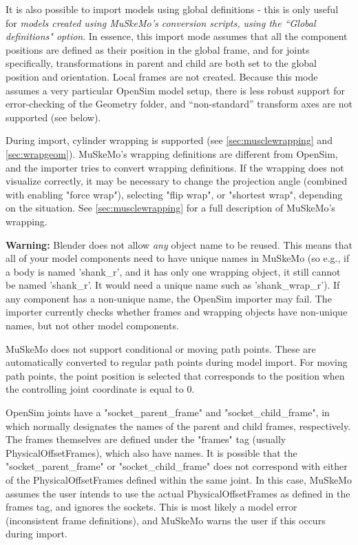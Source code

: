 \documentclass{article}
\begin{document}
It is also possible to import models using global definitions - this is only useful for \textit{models created using MuSkeMo's conversion scripts, using the ``Global definitions" option}. In essence, this import mode assumes that all the component positions are defined as their position in the global frame, and for joints specifically, transformations in parent and child are both set to the global position and orientation. Local frames are not created. Because this mode assumes a very particular OpenSim model setup, there is less robust support for error-checking of the Geometry folder, and ``non-standard'' transform axes are not supported (see below).

During import, cylinder wrapping is supported (see \ref{sec:musclewrapping} and \ref{sec:wrapgeom}). MuSkeMo's wrapping definitions are different from OpenSim, and the importer tries to convert wrapping definitions. If the wrapping does not visualize correctly, it may be necessary to change the projection angle (combined with enabling "force wrap"), selecting "flip wrap", or "shortest wrap", depending on the situation. See \ref{sec:musclewrapping} for a full description of MuSkeMo's wrapping.

\textbf{Warning:} Blender does not allow \textit{any} object name to be reused. This means that all of your model components need to have unique names in MuSkeMo (so e.g., if a body is named 'shank\_r', and it has only one wrapping object, it still cannot be named 'shank\_r'. It would need a unique name such as 'shank\_wrap\_r'). If any component has a non-unique name, the OpenSim importer may fail. The importer currently checks whether frames and wrapping objects have non-unique names, but not other model components.

MuSkeMo does not support conditional or moving path points. These are automatically converted to regular path points during model import. For moving path points, the point position is selected that corresponds to the position when the controlling joint coordinate is equal to 0.

OpenSim joints have a "socket\_parent\_frame" and "socket\_child\_frame", in which normally designates the names of the parent and child frames, respectively. The frames themselves are defined under the "frames" tag (usually PhysicalOffsetFrames), which also have names. It is possible that the "socket\_parent\_frame" or "socket\_child\_frame" does not correspond with either of the PhysicalOffsetFrames defined within the same joint. In this case, MuSkeMo assumes the user intends to use the actual PhysicalOffsetFrames as defined in the frames tag, and ignores the sockets. This is most likely a model error (inconsistent frame definitions), and MuSkeMo warns the user if this occurs during import.
\end{document}
